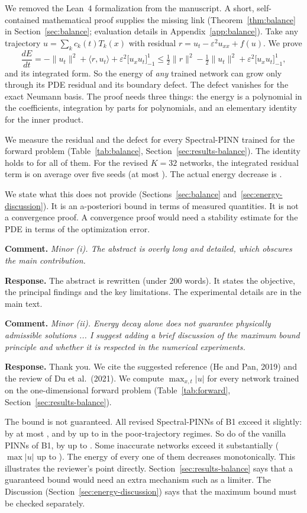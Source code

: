 \documentclass[11pt]{article}
\newcommand{\rc}[1]{\par\medskip\noindent\textbf{Comment.} \emph{#1}\par\smallskip\noindent\textbf{Response.} }
\begin{document}
We removed the Lean~4 formalization from the manuscript. A short, self-contained mathematical proof supplies the missing link (Theorem~\ref{thm:balance} in Section~\ref{sec:balance}; evaluation details in Appendix~\ref{app:balance}). Take any trajectory $u=\sum_kc_k(t)T_k(x)$ with residual $r=u_t-\varepsilon^2u_{xx}+f(u)$. We prove
\[
\frac{dE}{dt}=-\|u_t\|^2+\langle r,u_t\rangle+\varepsilon^2\bigl[u_xu_t\bigr]_{-1}^{1}\le\tfrac12\|r\|^2-\tfrac12\|u_t\|^2+\varepsilon^2\bigl[u_xu_t\bigr]_{-1}^{1},
\]
and its integrated form. So the energy of \emph{any} trained network can grow only through its PDE residual and its boundary defect. The defect vanishes for the exact Neumann basis. The proof needs three things: the energy is a polynomial in the coefficients, integration by parts for polynomials, and an elementary identity for the inner product.

We measure the residual and the defect for every Spectral-PINN trained for the forward problem (Table~\ref{tab:balance}, Section~\ref{sec:results-balance}). The identity holds to  for all of them. For the revised $K=32$ networks, the integrated residual term is  on average over five seeds (at most ). The actual energy decrease is .

We state what this does not provide (Sections~\ref{sec:balance} and~\ref{sec:energy-discussion}). It is an a-posteriori bound in terms of measured quantities. It is not a convergence proof. A convergence proof would need a stability estimate for the PDE in terms of the optimization error.

\rc{Minor (i). The abstract is overly long and detailed, which obscures the main contribution.}
The abstract is rewritten (under 200 words). It states the objective, the principal findings and the key limitations. The experimental details are in the main text.

\rc{Minor (ii). Energy decay alone does not guarantee physically admissible solutions ... I suggest adding a brief discussion of the maximum bound principle and whether it is respected in the numerical experiments.}
Thank you. We cite the suggested reference (He and Pan, 2019) and the review of Du et al.\ (2021). We compute $\max_{x,t}|u|$ for every network trained on the one-dimensional forward problem (Table~\ref{tab:forward}, Section~\ref{sec:results-balance}).

The bound is not guaranteed. All revised Spectral-PINNs of B1 exceed it slightly: by at most , and by up to  in the poor-trajectory regimes. So do  of the  vanilla PINNs of B1, by up to . Some inaccurate networks exceed it substantially ($\max|u|$ up to ). The energy of every one of them decreases monotonically. This illustrates the reviewer's point directly. Section~\ref{sec:results-balance} says that a guaranteed bound would need an extra mechanism such as a limiter. The Discussion (Section~\ref{sec:energy-discussion}) says that the maximum bound must be checked separately.
\end{document}
